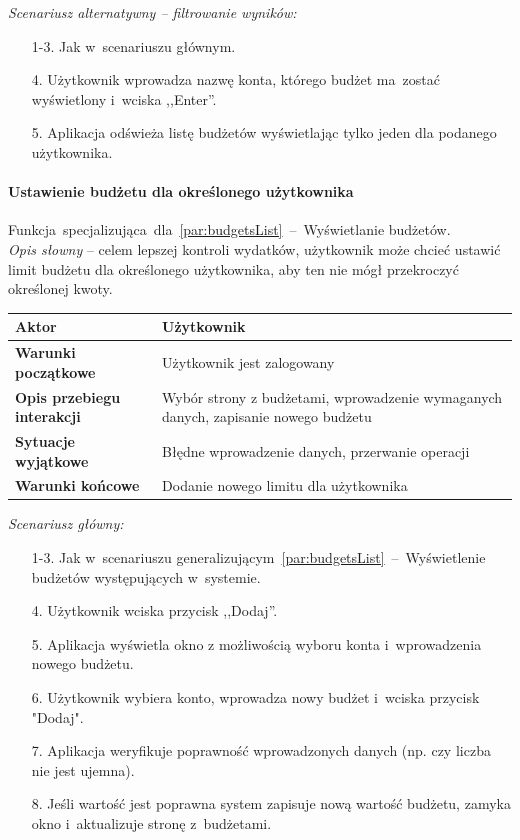 \noindent \textit{Scenariusz alternatywny -- filtrowanie wyników:}
\begin{enumerate}
  \item[1-3.] Jak w~scenariuszu głównym.
  \item[4.] Użytkownik wprowadza nazwę konta, którego budżet ma~zostać wyświetlony i~wciska ,,Enter''.
  \item[5.] Aplikacja odświeża listę budżetów wyświetlając tylko jeden dla podanego użytkownika.
\end{enumerate}

\paragraph{Ustawienie budżetu dla określonego użytkownika\newline}
\label{par:userBudget}
Funkcja~specjalizująca~dla~\ref{par:budgetsList}~--~Wyświetlanie budżetów.\\

\textit{Opis słowny} -- celem lepszej kontroli wydatków, użytkownik może chcieć ustawić limit budżetu dla określonego użytkownika, aby ten nie mógł przekroczyć określonej kwoty.

\begin{longtable}{|p{5cm}|p{7cm}|}
  \hline \textbf{Aktor} & Użytkownik \\
  \hline \textbf{Warunki początkowe} & Użytkownik jest zalogowany \\
  \hline \textbf{Opis przebiegu interakcji} & Wybór strony z budżetami, wprowadzenie wymaganych danych, zapisanie nowego budżetu \\
  \hline \textbf{Sytuacje wyjątkowe} & Błędne wprowadzenie danych, przerwanie operacji \\
  \hline \textbf{Warunki końcowe} & Dodanie nowego limitu dla użytkownika \\
  \hline
\end{longtable}

\noindent \textit{Scenariusz główny:}
\begin{enumerate}
  \item[1-3.] Jak w~scenariuszu generalizującym~\ref{par:budgetsList}~--~Wyświetlenie budżetów występujących w~systemie.
  \item[4.] Użytkownik wciska przycisk ,,Dodaj''.
  \item[5.] Aplikacja wyświetla okno z możliwością wyboru konta i~wprowadzenia nowego budżetu.
  \item[6.] Użytkownik wybiera konto, wprowadza nowy budżet i~wciska przycisk "Dodaj".
  \item[7.] Aplikacja weryfikuje poprawność wprowadzonych danych (np. czy liczba nie jest ujemna).
  \item[8.] Jeśli wartość jest poprawna system zapisuje nową wartość budżetu, zamyka okno i~aktualizuje stronę z~budżetami.
\end{enumerate}

